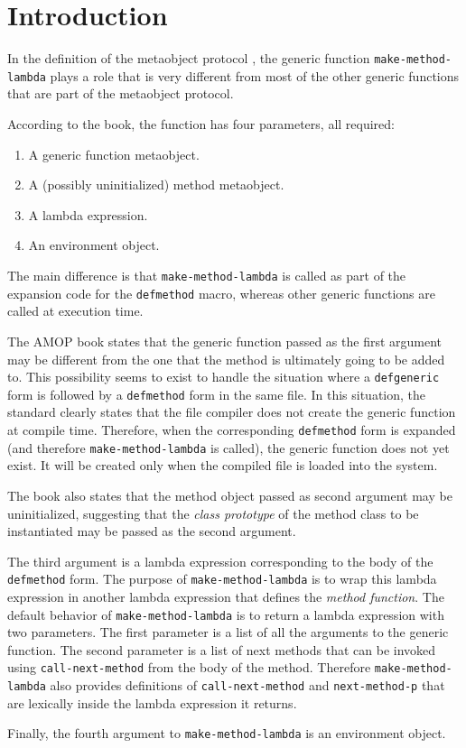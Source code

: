 \section{Introduction}

In the definition of the \commonlisp{} \cite{ansi:common:lisp}
metaobject protocol \cite{Kiczales:1991:AMP:574212}, the generic
function \texttt{make-method-lambda} plays a role that is very
different from most of the other generic functions that are part of
the metaobject protocol.

According to the book, the function has four parameters, all required:

\begin{enumerate}
\item A generic function metaobject.
\item A (possibly uninitialized) method metaobject.
\item A lambda expression.
\item An environment object.
\end{enumerate}

The main difference is that \texttt{make-method-lambda} is called as
part of the expansion code for the \texttt{defmethod} macro, whereas
other generic functions are called at execution time.

The AMOP book states that the generic function passed as the first
argument may be different from the one that the method is ultimately
going to be added to.  This possibility seems to exist to handle the
situation where a \texttt{defgeneric} form is followed by a
\texttt{defmethod} form in the same file.  In this situation, the
\commonlisp{} standard clearly states that the file compiler does not
create the generic function at compile time.  Therefore, when the
corresponding \texttt{defmethod} form is expanded (and therefore
\texttt{make-method-lambda} is called), the generic function does not
yet exist.  It will be created only when the compiled file is loaded
into the \commonlisp{} system.

The book also states that the method object passed as second argument
may be uninitialized, suggesting that the \emph{class prototype} of
the method class to be instantiated may be passed as the second
argument.

The third argument is a lambda expression corresponding to the body of
the \texttt{defmethod} form.  The purpose of
\texttt{make-method-lambda} is to wrap this lambda expression in
another lambda expression that defines the \emph{method function}.  The
default behavior of \texttt{make-method-lambda} is to return a lambda
expression with two parameters.  The first parameter is a list of all
the arguments to the generic function.  The second parameter is a list
of next methods that can be invoked using \texttt{call-next-method}
from the body of the method.  Therefore \texttt{make-method-lambda}
also provides definitions of \texttt{call-next-method} and
\texttt{next-method-p} that are lexically inside the lambda expression
it returns.

Finally, the fourth argument to \texttt{make-method-lambda} is an
environment object.
